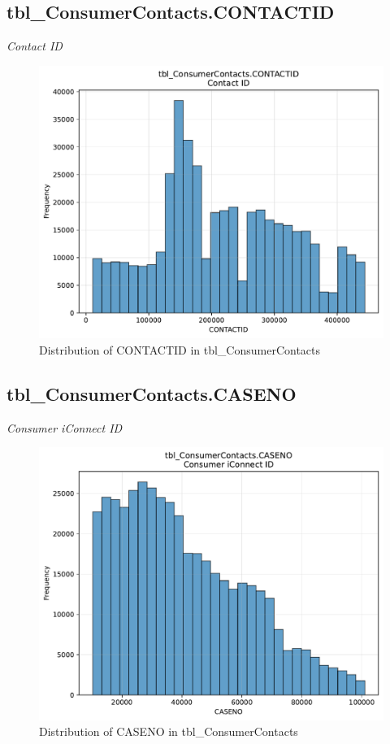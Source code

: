 \subsection{tbl\_ConsumerContacts.CONTACTID}
\textit{Contact ID}

\begin{figure}[htbp]
\centering
\includegraphics[width=\textwidth]{figures/dbo_tbl_ConsumerContacts_CONTACTID.pdf}
\caption{Distribution of CONTACTID in tbl\_ConsumerContacts}
\end{figure}\newpage

\subsection{tbl\_ConsumerContacts.CASENO}
\textit{Consumer iConnect ID}

\begin{figure}[htbp]
\centering
\includegraphics[width=\textwidth]{figures/dbo_tbl_ConsumerContacts_CASENO.pdf}
\caption{Distribution of CASENO in tbl\_ConsumerContacts}
\end{figure}\newpage

